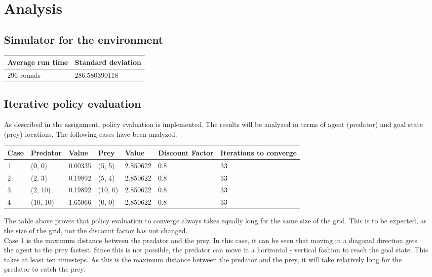 \documentclass{article}
\begin{document}
\section*{Analysis}


\subsection*{Simulator for the environment}


\begin{center}
	\begin{tabular}{  l ||  l }
		Average run time & Standard deviation \\ 
		\hline
		296 rounds &  286.580390118 %
	\end{tabular}
\end{center}

\subsection*{Iterative policy evaluation}
As described in the assignment, policy evaluation is implemented. The results will be analyzed in terms of agent (predator) and goal state (prey) locations. The following cases have been analyzed: %
\begin{center}
	\begin{tabular}{ |l | l | l | l | l | l | l| }
		Case & Predator & Value & Prey & Value & Discount Factor & Iterations to converge \\ 
		\hline
		1 & (0, 0) & 0.00335 & (5, 5) & 2.850622 & 0.8 & 33 \\
		2 & (2, 3) & 0.19892 & (5, 4) & 2.850622 & 0.8 & 33 \\
		3 & (2, 10) & 0.19892 & (10, 0) & 2.850622 & 0.8 & 33 \\
		4 & (10, 10) & 1.65066 & (0, 0) & 2.850622 & 0.8 & 33 \\	
	\end{tabular}
\end{center}

The table above proves that policy evaluation to converge always takes equally long for the same size of the grid. This is to be expected, as the size of the grid, nor the discount factor has not changed.\\

Case 1 is the maximum distance between the predator and the prey. In this case, it can be seen that moving in a diagonal direction gets the agent to the prey fastest. Since this is not possible, the predator can move in a horizontal - vertical fashion to reach the goal state. This takes at least ten timesteps. As this is the maximum distance between the predator and the prey, it will take relatively long for the predator to catch the prey. \\
\end{document}
